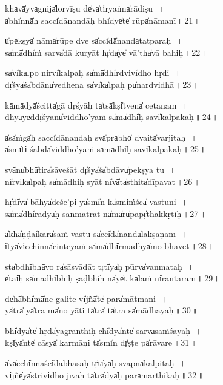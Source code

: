 \documentclass[parskip, 12pt, DIV=16, pagenumber=head,top, enableddeprecatedfontcommands]{scrartcl}
\begin{document}
kha̍vā̍yva̍gnija̍lorvī॒ṣu de̍va̍ti̍ryaṅna̍rādi॒ṣu॒\,~।\\
a̍bhi̍nnā̍ḥ sacci̍dāna॒ndāḥ bhi̍dye̍te̍ rūpa̍nāma॒nī॒\,॥\,21\,॥


u̍pe̍kṣya̍ nāma̍rūpe॒ dve sa̍cci̍dā̍nanda̍tatpa॒ra॒ḥ॒\,~।\\
sa̍mā̍dhi̍ṁ sarva̍dā ku॒ryāt hṛ̍da̍ye̍ vā'tha̍vā ba॒hi॒ḥ॒\,॥\,22\,॥

sa̍vi̍ka̍lpo nirvi̍ka॒lpaḥ sa̍mā̍dhi̍rdvivi̍dho hṛ॒di॒\,~।\\
dṛ̍śya̍śa̍bdānu̍vedhe॒na sa̍vi̍ka̍lpaḥ pu̍nardvi॒dhā॒\,॥\,23\,॥

kā̍mā̍dyā̍ścitta̍gā dṛ॒śyāḥ ta̍tsā̍kṣi̍tvena̍ ceta॒na॒m\,~।\\
dhyā̍ye̍ddṛ̍śyānu̍viddho॒'yaṁ sa̍mā̍dhi̍ḥ savi̍kalpa॒ka॒ḥ॒\,॥\,24\,॥

a̍sa̍ṁga̍ḥ sacci̍dāna॒ndaḥ sva̍pra̍bho̍ dvaita̍varji॒ta॒ḥ॒\,~।\\
a̍smī̍ti̍ śabda̍viddho॒'yaṁ sa̍mā̍dhi̍ḥ savi̍kalpa॒ka॒ḥ॒\,॥\,25\,॥

svā̍nu̍bhū̍tira̍sāve॒śāt dṛ̍śya̍śa̍bdāvu̍pekṣya॒ tu॒\,~।\\
ni̍rvi̍ka̍lpaḥ sa̍mādhi॒ḥ syāt ni̍vā̍ta̍sthita̍dīpa॒va॒t॒\,॥\,26\,॥

hṛ̍dī̍va̍ bāhya̍deśe॒'pi ya̍smi̍n ka̍smiṁśca̍ vastu॒ni॒\,~।\\
sa̍mā̍dhi̍rādya̍ḥ sanmā॒trāt nā̍ma̍rū̍papṛ̍thakkṛ॒ti॒ḥ॒\,॥\,27\,॥

a̍kha̍ṇḍai̍kara̍saṁ va॒stu sa̍cci̍dā̍nanda̍lakṣa॒ṇam\,~।\\
i̍tya̍vi̍cchinna̍cinte॒yaṁ sa̍mā̍dhi̍rmadhya̍mo bha॒ve॒t॒\,॥\,28\,॥

sta̍bdhī̍bhā̍vo ra̍sāsvā॒dāt tṛ̍tī̍ya̍ḥ pūrva̍vanma॒ta॒ḥ॒\,~।\\
e̍tai̍ḥ sa̍mādhi̍bhiḥ ṣa॒ḍbhiḥ na̍ye̍t kā̍laṁ ni̍ranta॒ra॒m\,॥\,29\,॥

\newpage

de̍hā̍bhi̍mā̍ne gali॒te vi̍jñā̍te̍ para̍mātma॒ni॒\,~।\\
ya̍tra̍ ya̍tra ma̍no yā॒ti ta̍tra̍ ta̍tra sa̍mādha॒ya॒ḥ\,॥\,30\,॥

bhi̍dya̍te̍ hṛda̍yagra॒nthiḥ chi̍dya̍nte̍ sarva̍saṁśa॒yā॒ḥ\,~।\\
kṣī̍ya̍nte̍ cāsya̍ karmā॒ṇi ta̍smi̍n dṛ̍ṣṭe pa̍rāva॒re॒\,॥\,31\,॥

a̍va̍cchi̍nnaści̍dābhā॒saḥ tṛ̍tī̍ya̍ḥ svapna̍kalpi॒taḥ\,~।\\
vi̍jñe̍ya̍strivi̍dho jī॒vaḥ ta̍trā̍dya̍ḥ pāra̍mārthi॒ka॒ḥ॒\,॥\,32\,॥
\end{document}
